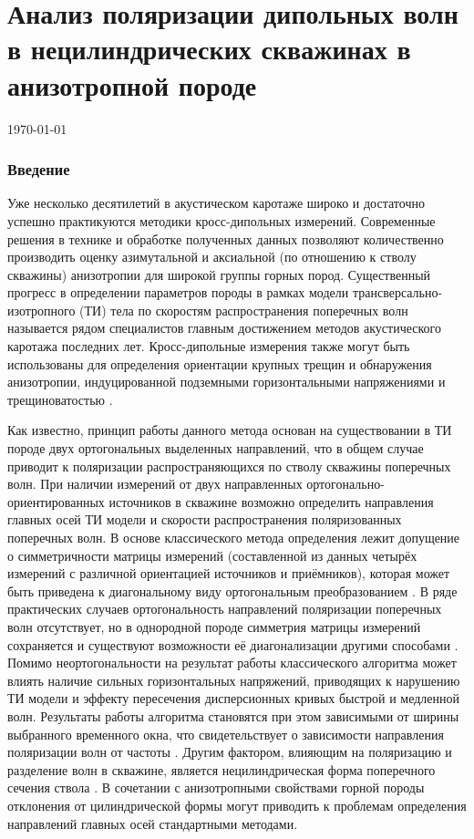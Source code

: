 \documentclass[a4paper,11pt]{article}
\begin{document}
\part*{Анализ поляризации дипольных волн в нецилиндрических скважинах в анизотропной породе}
\today

\section{Введение}
Уже несколько десятилетий в акустическом каротаже широко и достаточно успешно практикуются методики кросс-дипольных измерений. Современные решения в технике и обработке полученных данных позволяют количественно производить оценку азимутальной и аксиальной (по отношению к стволу скважины) анизотропии для широкой группы горных пород. Существенный прогресс в определении параметров породы в рамках модели трансверсально-изотропного (ТИ) тела по скоростям распространения поперечных волн называется рядом специалистов главным достижением методов акустического каротажа последних лет. Кросс-дипольные измерения также могут быть использованы для определения ориентации крупных трещин и обнаружения анизотропии, индуцированной подземными горизонтальными напряжениями и трещиноватостью \cite{Patterson2001}.

Как известно, принцип работы данного метода основан на существовании в ТИ породе двух ортогональных выделенных направлений, что в общем случае приводит к поляризации распространяющихся по стволу скважины поперечных волн. При наличии измерений от двух направленных ортогонально-ориентированных источников в скважине возможно определить направления главных осей ТИ модели и скорости распространения поляризованных поперечных волн. В основе классического метода определения лежит допущение о симметричности матрицы измерений (составленной из данных четырёх измерений с различной ориентацией источников и приёмников), которая может быть приведена к диагональному виду ортогональным преобразованием \cite{Alford1986}. В ряде практических случаев ортогональность направлений поляризации поперечных волн отсутствует, но в однородной породе симметрия матрицы измерений сохраняется и существуют возможности её диагонализации другими способами \cite{Dellinger1998}. Помимо неортогональности на результат работы классического алгоритма может влиять наличие сильных горизонтальных напряжений, приводящих к нарушению ТИ модели и эффекту пересечения дисперсионных кривых быстрой и медленной волн. Результаты работы алгоритма становятся при этом зависимыми от ширины выбранного временного окна, что свидетельствует о зависимости направления поляризации волн от частоты \cite{Nolte1997}. Другим фактором, влияющим на поляризацию и разделение волн в скважине, является нецилиндрическая форма поперечного сечения ствола \cite{Seroices2010}. В сочетании с анизотропными свойствами горной породы отклонения от цилиндрической формы могут приводить к проблемам определения направлений главных осей стандартными методами.
\end{document}
